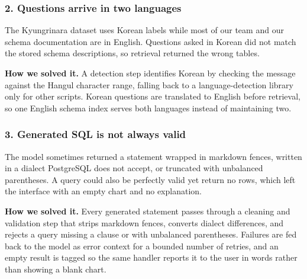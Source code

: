 \subsubsection*{2. Questions arrive in two languages}
The Kyungrinara dataset uses Korean labels while most of our team and
our schema documentation are in English. Questions asked in Korean did
not match the stored schema descriptions, so retrieval returned the
wrong tables.

\noindent \textbf{How we solved it.} A detection step identifies Korean by
checking the message against the Hangul character range, falling back to
a language-detection library only for other scripts. Korean questions
are translated to English before retrieval, so one English schema index
serves both languages instead of maintaining two.

\subsubsection*{3. Generated SQL is not always valid}
The model sometimes returned a statement wrapped in markdown fences,
written in a dialect PostgreSQL does not accept, or truncated with
unbalanced parentheses. A query could also be perfectly valid yet return
no rows, which left the interface with an empty chart and no
explanation.

\noindent \textbf{How we solved it.} Every generated statement passes through a
cleaning and validation step that strips markdown fences, converts
dialect differences, and rejects a query missing a  clause
or with unbalanced parentheses. Failures are fed back to the model as
error context for a bounded number of retries, and an empty result is
tagged so the same handler reports it to the user in words rather than
showing a blank chart.